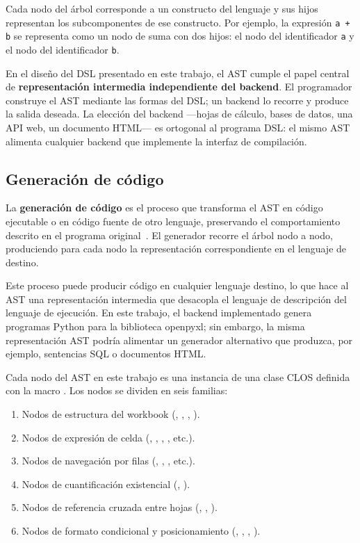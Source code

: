 Cada nodo del árbol corresponde a un constructo del lenguaje y sus hijos
representan los subcomponentes de ese constructo.  Por ejemplo, la expresión
\texttt{a + b} se representa como un nodo de suma con dos hijos: el nodo
del identificador \texttt{a} y el nodo del identificador \texttt{b}.

En el diseño del DSL presentado en este trabajo, el AST cumple el papel
central de \textbf{representación intermedia independiente del backend}.
El programador construye el AST mediante las formas del DSL; un backend
lo recorre y produce la salida deseada.  La elección del backend ---hojas
de cálculo, bases de datos, una API web, un documento HTML--- es ortogonal
al programa DSL: el mismo AST alimenta cualquier backend que implemente la
interfaz de compilación.

\subsection{Generaci\'on de c\'odigo}
\label{ssec:codegen}

La \textbf{generación de código} es el proceso que transforma el AST en
código ejecutable o en código fuente de otro lenguaje, preservando el
comportamiento descrito en el programa original~\cite{aho2006}.  El generador
recorre el árbol nodo a nodo, produciendo para cada nodo la representación
correspondiente en el lenguaje de destino.

Este proceso puede producir código en cualquier lenguaje destino, lo que hace
al AST una representación intermedia que desacopla el lenguaje de descripción
del lenguaje de ejecución.  En este trabajo, el backend implementado genera
programas Python para la biblioteca openpyxl; sin embargo, la misma
representación AST podría alimentar un generador alternativo que produzca,
por ejemplo, sentencias SQL o documentos HTML.

Cada nodo del AST en este trabajo es una instancia de una clase CLOS definida
con la macro .  Los nodos se dividen en seis familias:
\begin{enumerate}
  \item Nodos de estructura del workbook (, ,
    , ).
  \item Nodos de expresión de celda (,
    , , , etc.).
  \item Nodos de navegación por filas (,
    , , etc.).
  \item Nodos de cuantificación existencial (,
    ).
  \item Nodos de referencia cruzada entre hojas (,
    , ).
  \item Nodos de formato condicional y posicionamiento (,
    , , ).
\end{enumerate}

